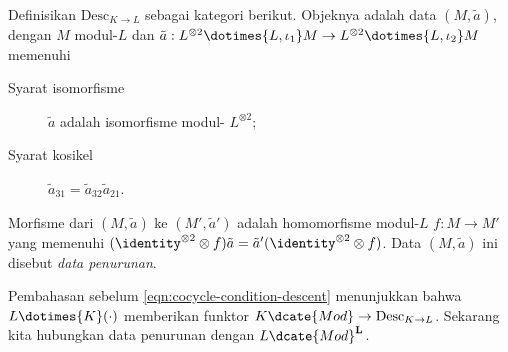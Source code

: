 \begin{definition}
	Definisikan $\mathrm{Desc}_{K\to L}$ sebagai kategori berikut. Objeknya
	adalah data $(M,\tilde a)$, dengan $M$ modul-$L$ dan
	$\tilde a:L^{\otimes2}\dotimes{L,\iota_1}M\to
	L^{\otimes2}\dotimes{L,\iota_2}M$ memenuhi
	\begin{description}
		\item[Syarat isomorfisme] $\tilde a$ adalah isomorfisme modul-
		$L^{\otimes2}$;
		\item[Syarat kosikel] $\tilde a_{31}=\tilde a_{32}\tilde a_{21}$.
	\end{description}

	Morfisme dari $(M,\tilde a)$ ke $(M',\tilde a')$ adalah homomorfisme
	modul-$L$ $f:M\to M'$ yang memenuhi
	$(\identity^{\otimes2}\otimes f)\tilde a=
	\tilde a'(\identity^{\otimes2}\otimes f)$. Data $(M,\tilde a)$ ini
	disebut \emph{data penurunan}.
\end{definition}

Pembahasan sebelum \eqref{eqn:cocycle-condition-descent} menunjukkan bahwa
$L\dotimes{K}(\mathord\cdot)$ memberikan funktor
$K\dcate{Mod}\to\mathrm{Desc}_{K\to L}$. Sekarang kita hubungkan data
penurunan dengan $L\dcate{Mod}^{\mathbf{L}}$.

